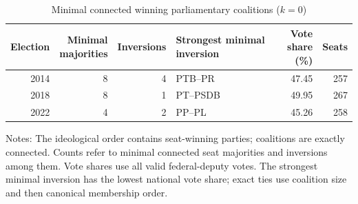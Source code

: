 \begin{table}[htbp]
\centering
\caption{Minimal connected winning parliamentary coalitions (\(k=0\))}
\label{tab:interval-summary}
\small
\setlength{\tabcolsep}{4pt}
\begin{tabularx}{\textwidth}{@{}rrr>{\raggedright\arraybackslash}Xrr@{}}
\toprule
Election & \shortstack{Minimal\\majorities} & Inversions & Strongest minimal inversion & \shortstack{Vote share\\(\%)} & Seats \\
\midrule
2014 & 8 & 4 & PTB--PR & 47.45 & 257 \\
2018 & 8 & 1 & PT--PSDB & 49.95 & 267 \\
2022 & 4 & 2 & PP--PL & 45.26 & 258 \\
\bottomrule
\end{tabularx}
\begin{flushleft}
\footnotesize Notes: The ideological order contains seat-winning parties; coalitions are exactly connected.
Counts refer to minimal connected seat majorities and inversions among them. Vote shares use all valid federal-deputy votes.
The strongest minimal inversion has the lowest national vote share; exact ties use coalition size and then canonical membership order.
\end{flushleft}
\end{table}
